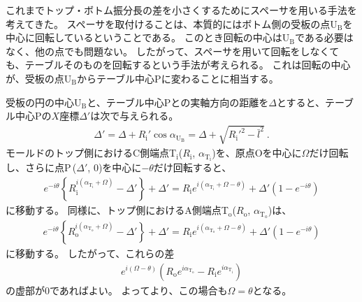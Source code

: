 \clearpage
これまでトップ・ボトム振分長の差を小さくするためにスペーサを用いる手法を考えてきた。
スペーサを取付けることは、本質的にはボトム側の受板の点U$_\mathrm B$を中心に回転しているということである。
このとき回転の中心はU$_\mathrm B$である必要はなく、他の点でも問題ない。
したがって、スペーサを用いて回転をしなくても、テーブルそのものを回転するという手法が考えられる。
これは回転の中心が、受板の点U$_\mathrm B$からテーブル中心Pに変わることに相当する。

受板の円の中心U$_\mathrm B$と、テーブル中心Pとの実軸方向の距離を$\varDelta$とすると、テーブル中心Pの$X$座標$\varDelta'$は次で与えられる。
\begin{align}
  \label{eq:tableCenter}
  \varDelta'
  = \varDelta+R_\mathrm i'\cos\alpha_{\mathrm U_\mathrm B} = \varDelta+\sqrt{R_\mathrm i'^2-\bar l^2}\ .
\end{align}
モールドのトップ側におけるC側端点T$_\mathrm i$($R_\mathrm i$, $\alpha_{\mathrm T_\mathrm i}$)を、原点Oを中心に$\Omega$だけ回転し、さらに点P\,($\varDelta'$, $0$)を中心に$-\theta$だけ回転すると、
\begin{align}
  \label{eq:afterfttable}
  e^{-i\theta}\left\{R_\mathrm i^{i(\alpha_{\mathrm T_\mathrm i}+\Omega)}-\varDelta'\right\}+\varDelta'
  = R_\mathrm ie^{i(\alpha_{\mathrm T_\mathrm i}+\Omega-\theta)}+\varDelta'\left(1-e^{-i\theta}\right)
\end{align}
に移動する。
同様に、トップ側におけるA側端点T$_\mathrm o$($R_\mathrm o$, $\alpha_{\mathrm T_\mathrm o}$)は、
\begin{align*}
  e^{-i\theta}\!\left\{R_\mathrm o^{i(\alpha_{\mathrm T_\mathrm o}+\Omega)}-\varDelta'\right\}+\varDelta'
  = R_\mathrm ie^{i(\alpha_{\mathrm T_\mathrm o}+\Omega-\theta)}+\varDelta'\!\left(1-e^{-i\theta}\right)
\end{align*}
に移動する。
したがって、これらの差
\begin{align*}
  e^{i(\Omega-\theta)}\!
  \left(R_\mathrm oe^{i\alpha_{\mathrm T_\mathrm o}}-R_\mathrm ie^{i\alpha_{\mathrm T_\mathrm i}}\right)
\end{align*}
の虚部が$0$であればよい。
よってより、この場合も$\Omega = \theta$となる。



